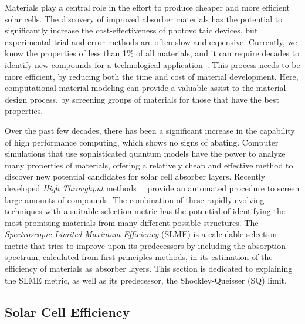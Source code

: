 \begin{refsection}
Materials play a central role in the effort to produce cheaper and more 
efficient solar cells. The discovery of improved absorber materials has the 
potential to significantly increase the cost-effectiveness of photovoltaic 
devices, but experimental trial and error methods are often slow and 
expensive. Currently, we know the properties of less than 1\% of all 
materials, and it can require decades to identify new compounds for a 
technological application~\cite{Jain2013}. This process needs to be more 
efficient, by reducing both the time and cost of material development. Here, 
computational material modeling can provide a valuable assist to the material 
design process, by screening groups of materials for those that have the best 
properties.  
 
Over the past few decades, there has been a significant increase in the 
capability of high performance computing, which shows no signs of abating. 
Computer simulations that use sophisticated quantum models have the power to 
analyze many properties of materials, offering a relatively cheap and 
effective method to discover new potential candidates for solar cell absorber 
layers. Recently developed \textit{High Throughput} 
methods~\cite{Curtarolo2013}~\cite{Sarmadian2016} provide an automated 
procedure to screen large amounts of compounds. The combination of these 
rapidly evolving techniques with a suitable selection metric has the potential 
of identifying the most promising materials from many different possible 
structures. The \textit{Spectroscopic Limited Maximum Efficiency} (SLME) is a 
calculable selection metric that tries to improve upon its predecessors by 
including the absorption spectrum, calculated from first-principles methods, 
in its estimation of the efficiency of materials as absorber layers. This 
section is dedicated to explaining the SLME metric, as well as its 
predecessor, the Shockley-Queisser (SQ) limit.  
 
\subsection{Solar Cell Efficiency} \label{slme:sec-efficiency} 
 

\end{refsection}
